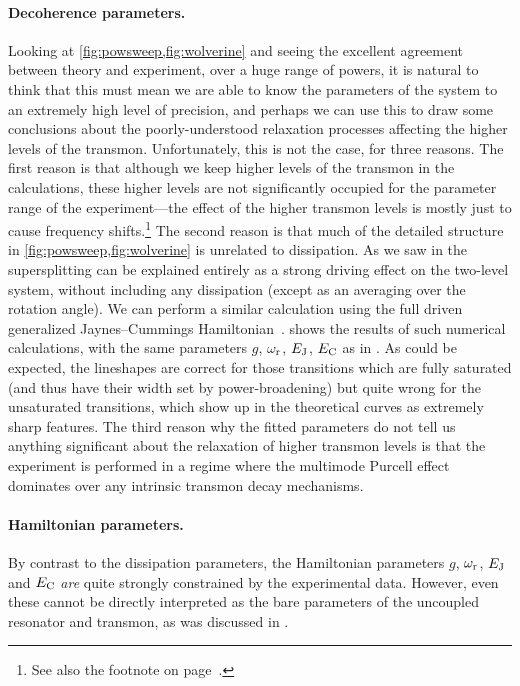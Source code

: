 \paragraph{Decoherence parameters.}
Looking at \cref{fig:powsweep,fig:wolverine} and seeing the excellent agreement between theory and experiment, over a huge range of powers, it is natural to think that this must mean we are able to know the parameters of the system to an extremely high level of precision, and perhaps we can use this to draw some conclusions about the poorly-understood relaxation processes affecting the higher levels of the transmon. Unfortunately, this is not the case, for three reasons. The first reason is that although we keep higher levels of the transmon in the calculations, these higher levels are not significantly occupied for the parameter range of the experiment---the effect of the higher transmon levels is mostly just to cause frequency shifts.\footnote{See also the footnote on page~\pageref{ftn:trnc}.} The second reason is that much of the detailed structure in \cref{fig:powsweep,fig:wolverine} is unrelated to dissipation. As we saw in  the supersplitting can be explained entirely as a strong driving effect on the two-level system, without including any dissipation (except as an averaging over the rotation angle). We can perform a similar calculation using the full driven generalized Jaynes--Cummings Hamiltonian~.  shows the results of such numerical calculations, with the same parameters $g$, $\omega_{\text{r}}$, $E_{\text{J}}$, $E_{\text{C}}$ as in . As could be expected, the lineshapes are correct for those transitions which are fully saturated (and thus have their width set by power-broadening) but quite wrong for the unsaturated transitions, which show up in the theoretical curves as extremely sharp features. The third reason why the fitted parameters do not tell us anything significant about the relaxation of higher transmon levels is that the experiment is performed in a regime where the multimode Purcell effect dominates over any intrinsic transmon decay mechanisms.

\paragraph{Hamiltonian parameters.}By contrast to the dissipation parameters, the Hamiltonian parameters $g$, $\omega_{\text{r}}$, $E_{\text{J}}$ and $E_{\text{C}}$ \emph{are} quite strongly constrained by the experimental data. However, even these cannot be directly interpreted as the bare parameters of the uncoupled resonator and transmon, as was discussed in .

